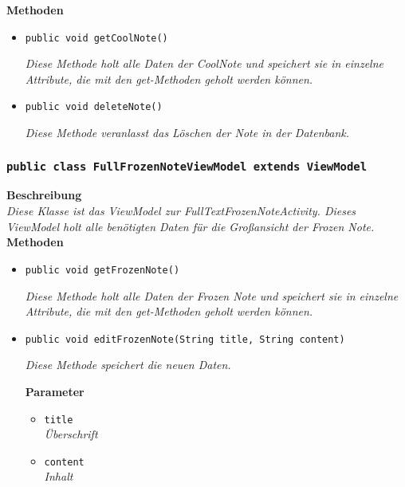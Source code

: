 		\textbf{Methoden}
 			\begin{itemize}
        		\item\texttt{public void getCoolNote()}
        	
        		\textit{Diese Methode holt alle Daten der CoolNote und speichert sie in einzelne Attribute, die mit den get-Methoden geholt werden können.}
        
               	\item\texttt{{public void deleteNote()}}
        	
        		\textit{Diese Methode veranlasst das Löschen der Note in der Datenbank.}

       		 \end{itemize}
             
             
        \subsubsection{\texttt{public class FullFrozenNoteViewModel extends ViewModel}}
        \textbf{Beschreibung} \\
        \textit{Diese Klasse ist das ViewModel zur FullTextFrozenNoteActivity. Dieses ViewModel holt alle benötigten Daten für die Großansicht der Frozen Note.}\\
        
		\textbf{Methoden}
 			\begin{itemize}
        		\item\texttt{{public void getFrozenNote()}}
        	
        		\textit{Diese Methode holt alle Daten der Frozen Note und speichert sie in einzelne Attribute, die mit den get-Methoden geholt werden können.}
        		
        		\item\texttt{{public void editFrozenNote(String title, String content)}}
        	
        		\textit{Diese Methode speichert die neuen Daten.}
        		
        	
        	\textbf{Parameter}
        	\begin{itemize}
        		\item\texttt{title}\\
				\textit{Überschrift}
				\item\texttt{content}\\
				\textit{Inhalt}
			\end{itemize}
		
		\end{itemize}
       		 
